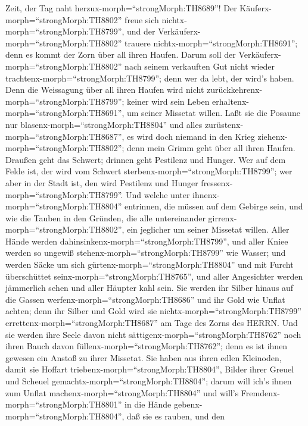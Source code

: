 Zeit, der Tag naht herzux-morph=``strongMorph:TH8689''! Der
Käuferx-morph=``strongMorph:TH8802'' freue sich
nichtx-morph=``strongMorph:TH8799'', und der
Verkäuferx-morph=``strongMorph:TH8802'' trauere
nichtx-morph=``strongMorph:TH8691''; denn es kommt der Zorn über all
ihren Haufen.  Darum soll der
Verkäuferx-morph=``strongMorph:TH8802'' nach seinem verkauften Gut nicht
wieder trachtenx-morph=``strongMorph:TH8799''; denn wer da lebt, der
wird's haben. Denn die Weissagung über all ihren Haufen wird nicht
zurückkehrenx-morph=``strongMorph:TH8799''; keiner wird sein Leben
erhaltenx-morph=``strongMorph:TH8691'', um seiner Missetat willen.
 Laßt sie die Posaune nur
blasenx-morph=``strongMorph:TH8804'' und alles
zurüstenx-morph=``strongMorph:TH8687'', es wird doch niemand in den
Krieg ziehenx-morph=``strongMorph:TH8802''; denn mein Grimm geht über
all ihren Haufen.  Draußen geht das Schwert; drinnen geht
Pestilenz und Hunger. Wer auf dem Felde ist, der wird vom Schwert
sterbenx-morph=``strongMorph:TH8799''; wer aber in der Stadt ist, den
wird Pestilenz und Hunger fressenx-morph=``strongMorph:TH8799''.
 Und welche unter ihnenx-morph=``strongMorph:TH8804''
entrinnen, die müssen auf dem Gebirge sein, und wie die Tauben in den
Gründen, die alle untereinander girrenx-morph=``strongMorph:TH8802'',
ein jeglicher um seiner Missetat willen.  Aller Hände
werden dahinsinkenx-morph=``strongMorph:TH8799'', und aller Kniee werden
so ungewiß stehenx-morph=``strongMorph:TH8799'' wie Wasser;
 und werden Säcke um sich
gürtenx-morph=``strongMorph:TH8804'' und mit Furcht überschüttet
seinx-morph=``strongMorph:TH8765'', und aller Angesichter werden
jämmerlich sehen und aller Häupter kahl sein.  Sie werden
ihr Silber hinaus auf die Gassen werfenx-morph=``strongMorph:TH8686''
und ihr Gold wie Unflat achten; denn ihr Silber und Gold wird sie
nichtx-morph=``strongMorph:TH8799''
errettenx-morph=``strongMorph:TH8687'' am Tage des Zorns des HERRN. Und
sie werden ihre Seele davon nicht sättigenx-morph=``strongMorph:TH8762''
noch ihren Bauch davon füllenx-morph=``strongMorph:TH8762''; denn es ist
ihnen gewesen ein Anstoß zu ihrer Missetat.  Sie haben aus
ihren edlen Kleinoden, damit sie Hoffart
triebenx-morph=``strongMorph:TH8804'', Bilder ihrer Greuel und Scheuel
gemachtx-morph=``strongMorph:TH8804''; darum will ich's ihnen zum Unflat
machenx-morph=``strongMorph:TH8804''  und will's
Fremdenx-morph=``strongMorph:TH8801'' in die Hände
gebenx-morph=``strongMorph:TH8804'', daß sie es rauben, und den
